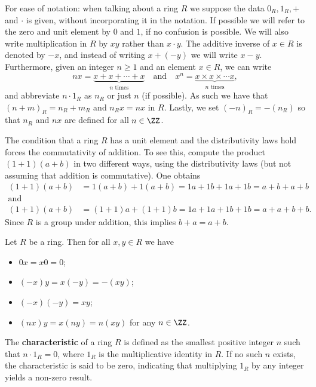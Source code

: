 \documentclass[12pt, a4paper]{article}
\begin{document}
\begin{mdremark}
    For ease of notation: when talking about a ring \(R\) we suppose the data \(0_R,1_R,+\) and \(\cdot\) is given, without incorporating it in the notation. If possible we will refer to the zero and unit element by \(0\) and \(1\), if no confusion is possible. We will also write multiplication in \(R\) by \(xy\) rather than \(x \cdot y\). The additive inverse of \(x \in R\) is denoted by \(-x\), and instead of writing \(x+(-y)\) we will write \(x-y\). Furthermore, given an integer \(n \geq 1\) and an element \(x \in R\), we can write 
    \[nx = \underbrace{x+x+ \cdots + x}_{n \text{ times}} \quad \text{and} \quad x^n = \underbrace{x \times x\times \cdots x}_{n \text{ times}},\]
    and abbreviate \(n \cdot 1_R\) as \(n_R\) or just \(n\) (if possible).
    As such we have that \((n+m)_R = n_R +m_R\) and \(n_R x =nx\) in \(R\).
    Lastly, we set \((-n)_R = -(n_R)\)  so that \(n_R\) and \(nx\) are defined for all \(n \in \ZZ\).
\end{mdremark}

\begin{mdnote}
    The condition that a ring \(R\) has a unit element and the distributivity laws hold forces the commutativity of addition. To see this, compute the product \((1+1)(a+b)\) in two different ways, using the distributivity laws (but not assuming that addition is commutative). One obtains
    \[\begin{aligned}
        (1+1)(a+b)&=1(a+b)+1(a+b)=1a+1b+1a+1b=a+b+a+b \\
        \text{and} \\
        (1+1)(a+b)&=(1+1)a+(1+1)b=1a+1a+1b+1b=a+a+b+b.
    \end{aligned}\]
    Since \(R\) is a group under addition, this implies \(b+a=a+b\).
\end{mdnote}

\begin{proposition}
    Let \(R\) be a ring. Then for all \(x,y \in R\) we have 
    \begin{itemize}
        \item \(0x=x0=0\);
        \item \((-x)y=x(-y)=-(xy)\);
        \item \((-x)(-y)=xy\);
        \item \((nx)y=x(ny)=n(xy)\) for any \(n \in \ZZ\).
    \end{itemize}
\end{proposition}

\begin{definition}
    The \textbf{characteristic} of a ring \( R \) is defined as the smallest positive integer \( n \) such that \( n \cdot 1_R = 0 \), where \( 1_R \) is the multiplicative identity in \( R \). If no such \( n \) exists, the characteristic is said to be zero, indicating that multiplying \( 1_R \) by any integer yields a non-zero result.
\end{definition}
\end{document}
